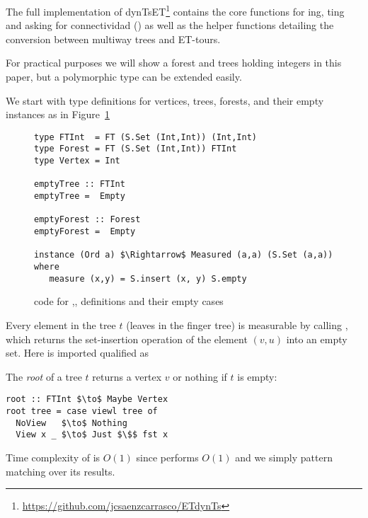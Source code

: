 The full implementation of dynTsET\footnote{\url{https://github.com/jcsaenzcarrasco/ETdynTs}} contains the core functions for ing, ting and asking for connectividad () as well as the helper functions detailing the conversion between multiway trees and ET-tours.


For practical purposes we will show a forest and trees holding integers in this paper, but a polymorphic type can be extended easily.

We start with type definitions for vertices, trees, forests, and their empty instances as in Figure~\ref{fig:emptys}
\begin{figure}
\begin{lstlisting}[mathescape]
type FTInt  = FT (S.Set (Int,Int)) (Int,Int) 
type Forest = FT (S.Set (Int,Int)) FTInt 
type Vertex = Int 

emptyTree :: FTInt
emptyTree =  Empty 

emptyForest :: Forest
emptyForest =  Empty

instance (Ord a) $\Rightarrow$ Measured (a,a) (S.Set (a,a)) where 
   measure (x,y) = S.insert (x, y) S.empty 
\end{lstlisting}   
\caption{code for ,, definitions and their empty cases}
\label{fig:emptys}
\end{figure}

Every element in the tree $t$ (leaves in the finger tree) is measurable by calling , which returns the set-insertion operation of the element $(v,u)$ into an empty set. Here  is imported qualified as 

The \textit{root} of a tree $t$ returns a vertex $v$ or nothing if $t$ is empty:
\begin{lstlisting}[mathescape]
root :: FTInt $\to$ Maybe Vertex  
root tree = case viewl tree of
  NoView   $\to$ Nothing
  View x _ $\to$ Just $\$$ fst x
\end{lstlisting}

Time complexity of  is $O(1)$ since  performs $O(1)$ and we simply pattern matching over its results.

